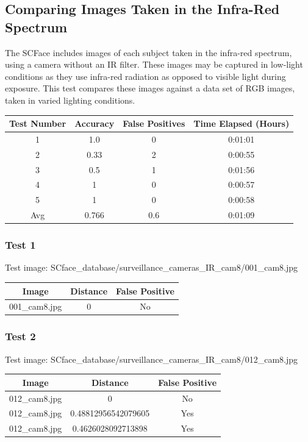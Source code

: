 \documentclass[12pt]{article}
\begin{document}
\subsection{Comparing Images Taken in the Infra-Red Spectrum}
The SCFace includes images of each subject taken in the infra-red spectrum, using a camera without an IR filter. These images may be captured in low-light conditions as they use infra-red radiation as opposed to visible light during exposure. This test compares these images against a data set of RGB images, taken in varied lighting conditions.

\begin{center}
\begin{tabular}{cccc}
Test Number & Accuracy & False Positives & Time Elapsed (Hours) \\
\hline
1 & 1.0 & 0 & 0:01:01\\
2 & 0.33 & 2 & 0:00:55\\
3 & 0.5 & 1 & 0:01:56\\
4 & 1 & 0 & 0:00:57\\
5 & 1 & 0 & 0:00:58\\
Avg & 0.766 & 0.6 & 0:01:09 \\ 
\end{tabular}
\end{center}

\subsubsection{Test 1}
Test image: SCface\_database/surveillance\_cameras\_IR\_cam8/001\_cam8.jpg

\begin{center}
\begin{tabular}{ccc}
Image & Distance & False Positive \\
\hline
001\_cam8.jpg & 0 & No \\
\end{tabular}
\end{center}

\subsubsection{Test 2}
Test image: SCface\_database/surveillance\_cameras\_IR\_cam8/012\_cam8.jpg

\begin{center}
\begin{tabular}{ccc}
Image & Distance & False Positive \\
\hline
012\_cam8.jpg & 0 & No \\
012\_cam8.jpg & 0.48812956542079605 & Yes \\
012\_cam8.jpg & 0.4626028092713898 & Yes \\
\end{tabular}
\end{center}
\end{document}
